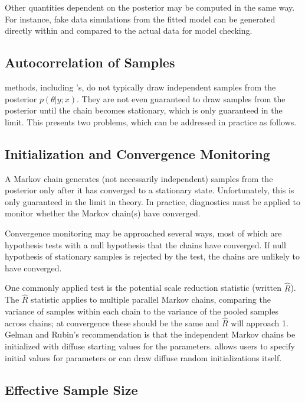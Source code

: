 Other quantities dependent on the posterior may be computed in the
same way.  For instance, fake data simulations from the fitted model
can be generated directly within \Stan and compared to the actual data
for model checking.

\subsection{Autocorrelation of Samples}

\MCMC methods, including \Stan's, do not typically draw independent
samples from the posterior $p(\theta|y;x)$.  They are not even
guaranteed to draw samples from the posterior until the chain becomes
stationary, which is only guaranteed in the limit.  This presents two
problems, which can be addressed in practice as follows.

\subsection{Initialization and Convergence Monitoring}

A Markov chain generates (not necessarily independent) samples from
the posterior only after it has converged to a stationary state.
Unfortunately, this is only guaranteed in the limit in theory.  In
practice, diagnostics must be applied to monitor whether the Markov chain(s)
have converged.

Convergence monitoring may be approached several ways, most of which
are hypothesis tests with a null hypothesis that the chains have
converged.  If null hypothesis of stationary samples is rejected by
the test, the chains are unlikely to have converged. 

One commonly applied test is the \cite{GelmanRubin:1992} potential
scale reduction statistic (written $\hat{R}$).  The $\hat{R}$
statistic applies to multiple parallel Markov chains, comparing the
variance of samples within each chain to the variance of the pooled
samples across chains; at convergence these should be the same and
$\hat{R}$ will approach 1.  Gelman and Rubin's recommendation is that
the independent Markov chains be initialized with diffuse starting
values for the parameters.  \Stan allows users to specify initial
values for parameters or can draw diffuse random initializations
itself.

\subsection{Effective Sample Size}

